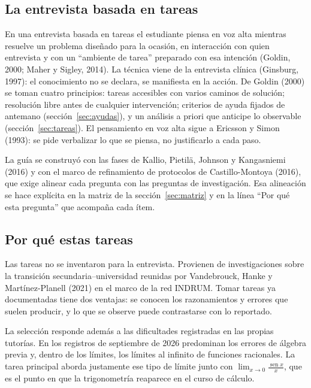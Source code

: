 \documentclass[11pt,letterpaper]{article}
\DeclareMathOperator{\seno}{sen}
\newcommand{\limsen}{\displaystyle\lim_{x\to 0}\frac{\seno x}{x}}
\newcounter{preg}
\begin{document}
\subsection{La entrevista basada en tareas}
En una entrevista basada en tareas el estudiante piensa en voz alta mientras resuelve un problema diseñado para la ocasión, en interacción con quien entrevista y con un ``ambiente de tarea'' preparado con esa intención (Goldin, 2000; Maher y Sigley, 2014). La técnica viene de la entrevista clínica (Ginsburg, 1997): el conocimiento no se declara, se manifiesta en la acción. De Goldin (2000) se toman cuatro principios: tareas accesibles con varios caminos de solución; resolución libre antes de cualquier intervención; criterios de ayuda fijados de antemano (sección~\ref{sec:ayudas}), y un análisis a priori que anticipe lo observable (sección~\ref{sec:tareas}). El pensamiento en voz alta sigue a Ericsson y Simon (1993): se pide verbalizar lo que se piensa, no justificarlo a cada paso.

La guía se construyó con las fases de Kallio, Pietilä, Johnson y Kangasniemi (2016) y con el marco de refinamiento de protocolos de Castillo-Montoya (2016), que exige alinear cada pregunta con las preguntas de investigación. Esa alineación se hace explícita en la matriz de la sección~\ref{sec:matriz} y en la línea ``Por qué esta pregunta'' que acompaña cada ítem.

\subsection{Por qué estas tareas}
Las tareas no se inventaron para la entrevista. Provienen de investigaciones sobre la transición secundaria--universidad reunidas por Vandebrouck, Hanke y Martínez-Planell (2021) en el marco de la red INDRUM. Tomar tareas ya documentadas tiene dos ventajas: se conocen los razonamientos y errores que suelen producir, y lo que se observe puede contrastarse con lo reportado.

La selección responde además a las dificultades registradas en las propias tutorías. En los registros de septiembre de 2026 predominan los errores de álgebra previa y, dentro de los límites, los límites al infinito de funciones racionales. La tarea principal aborda justamente ese tipo de límite junto con $\limsen$, que es el punto en que la trigonometría reaparece en el curso de cálculo.
\end{document}
